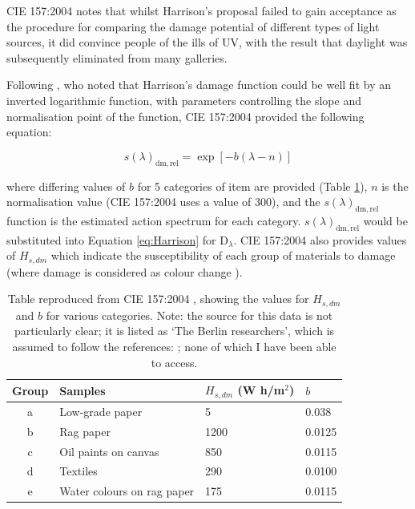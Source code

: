 \gls{CIE} 157:2004 \citep{cie_cie_2004} notes that whilst Harrison's proposal failed to gain acceptance as the procedure for comparing the damage potential of different types of light sources, it did convince people of the ills of \gls{UV}, with the result that daylight was subsequently eliminated from many galleries.

Following \citet{cuttle_lighting_1988}, who noted that Harrison's damage function could be well fit by an inverted logarithmic function, with parameters controlling the slope and normalisation point of the function, \gls{CIE} 157:2004 provided the following equation:

\begin{equation}
    s(\lambda)_{\mathrm{dm,rel}}=\exp [-b(\lambda-n)]
    \label{eq:damfac}
\end{equation}

where differing values of $b$ for 5 categories of item are provided (Table \ref{tab:b}), $n$ is the normalisation value (\gls{CIE} 157:2004 uses a value of 300), and the $s(\lambda)_{\mathrm{dm,rel}}$ function is the estimated action spectrum for each category. $s(\lambda)_{\mathrm{dm,rel}}$ would be substituted into Equation \ref{eq:Harrison} for $\mathrm{D}_{\lambda}$. \gls{CIE} 157:2004 also provides values of $H_{s,dm}$ which indicate the susceptibility of each group of materials to damage (where damage is considered as colour change%
).

\begin{table}[htbp]
\centering
\begin{tabular}{|c|l|l|l|}
\hline
Group & Samples & $H_{s,dm}$ (W h/m$^{2}$) & $b$ \\ \hline
a & Low-grade paper & 5 & 0.038 \\ \hline
b & Rag paper & 1200 & 0.0125 \\ \hline
c & Oil paints on canvas & 850 & 0.0115 \\ \hline
d & Textiles & 290 & 0.0100 \\ \hline
e & Water colours on rag paper & 175 & 0.0115 \\ \hline
\end{tabular}
\caption{Table reproduced from \gls{CIE} 157:2004 \citep{cie_cie_2004}, showing the values for $H_{s,dm}$ and $b$ for various categories. Note: the source for this data is not particularly clear; it is listed as `The Berlin researchers', which is assumed to follow the references: \citet{krochmann_beleuchtung_1988,cie_cie_1991,hilbert_zur_1991}; none of which I have been able to access.}
\label{tab:b}
\end{table}


